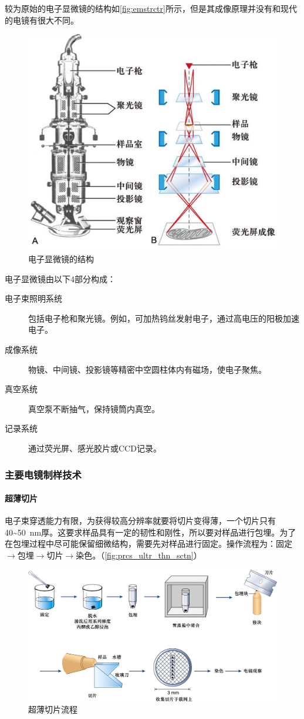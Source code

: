 较为原始的电子显微镜的结构如\autoref{fig:emstrctr}所示，但是其成像原理并没有和现代的电镜有很大不同。

\begin{figure}[htbp]
	\centering
	\includegraphics[width=0.5\linewidth]{Pics/EM_strctr}
	\caption{电子显微镜的结构}
	\label{fig:emstrctr}
\end{figure}

电子显微镜由以下4部分构成：
\begin{description}
	\item[电子束照明系统] 包括电子枪和聚光镜。例如，可加热钨丝发射电子，通过高电压的阳极加速电子。
	\item[成像系统] 物镜、中间镜、投影镜等精密中空圆柱体内有磁场，使电子聚焦。
	\item[真空系统] 真空泵不断抽气，保持镜筒内真空。
	\item[记录系统] 通过荧光屏、感光胶片或CCD记录。
\end{description}

\subsubsection{主要电镜制样技术}

\paragraph{超薄切片}

电子束穿透能力有限，为获得较高分辨率就要将切片变得薄，一个切片只有40\textasciitilde\SI{50}{\nm}厚。这要求样品具有一定的韧性和刚性，所以要对样品进行包埋。为了在包埋过程中尽可能保留细微结构，需要先对样品进行固定。操作流程为：固定$\longrightarrow$包埋$\longrightarrow$切片$\longrightarrow$染色。（\autoref{fig:prcs_ultr_thn_sctn}）

\begin{figure}[htbp]
	\centering
	\includegraphics[width=\linewidth]{Pics/超薄切片流程}
	\caption{超薄切片流程}
	\label{fig:prcs_ultr_thn_sctn}
\end{figure}

